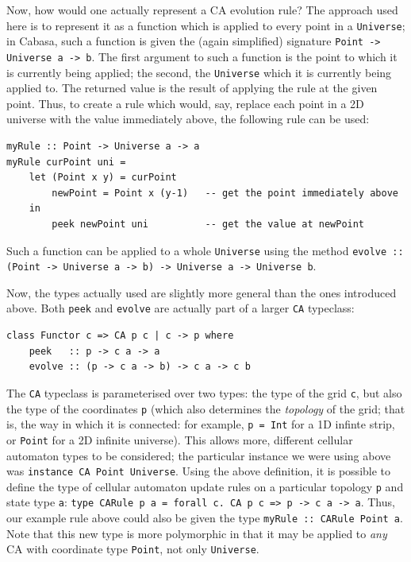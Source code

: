 \documentclass[oneside,a4paper]{memoir}
\begin{document}
Now, how would one actually represent a CA evolution rule?
The approach used here is to represent it as a function which is applied to every point in a \texttt{Universe};
  in Cabasa, such a function is given the (again simplified) signature \texttt{Point -> Universe~a -> b}.
The first argument to such a function is the point to which it is currently being applied;
  the second, the \texttt{Universe} which it is currently being applied to.
The returned value is the result of applying the rule at the given point.
Thus, to create a rule which would, say, replace each point in a 2D universe with the value immediately above,
  the following rule can be used:

\begin{verbatim}
myRule :: Point -> Universe a -> a
myRule curPoint uni =
    let (Point x y) = curPoint
        newPoint = Point x (y-1)   -- get the point immediately above
    in
        peek newPoint uni          -- get the value at newPoint
\end{verbatim}

Such a function can be applied to a whole \texttt{Universe} using the method
  \texttt{evolve~:: (Point -> Universe a -> b) -> Universe a -> Universe b}.

Now, the types actually used are slightly more general than the ones introduced above.
Both \texttt{peek} and \texttt{evolve} are actually part of a larger \texttt{CA} typeclass:

\begin{verbatim}
class Functor c => CA p c | c -> p where
    peek   :: p -> c a -> a
    evolve :: (p -> c a -> b) -> c a -> c b
\end{verbatim}

The \texttt{CA} typeclass is parameterised over two types:
  the type of the grid \texttt{c},
  but also the type of the coordinates \texttt{p}
  (which also determines the \emph{topology} of the grid; that is, the way in which it is connected:
    for example, \texttt{p = Int} for a 1D infinte strip, or \texttt{Point} for a 2D infinite universe).
This allows more, different cellular automaton types to be considered;
  the particular instance we were using above was \texttt{instance~CA Point Universe}.
Using the above definition, it is possible to define the type of cellular automaton update rules
  on a particular topology \texttt{p} and state type \texttt{a}:
  \texttt{type CARule p a = forall c. CA p c => p -> c a -> a}.
Thus, our example rule above could also be given the type \texttt{myRule :: CARule Point a}.
Note that this new type is more polymorphic
  in that it may be applied to \textit{any} CA with coordinate type \texttt{Point},
  not only \texttt{Universe}.
\end{document}
